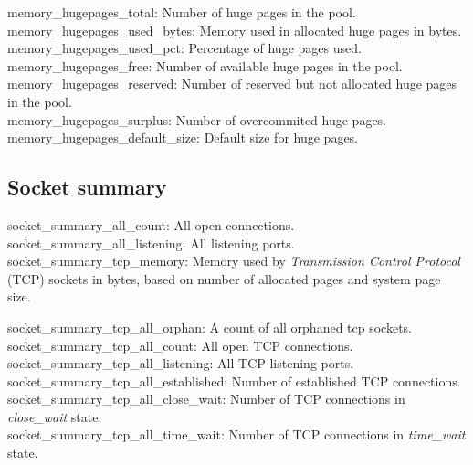 \documentclass{iosart2c}
\begin{document}
memory\_hugepages\_total: Number of huge pages in the pool.\\

memory\_hugepages\_used\_bytes: Memory used in allocated huge pages in bytes.\\

memory\_hugepages\_used\_pct: Percentage of huge pages used.\\

memory\_hugepages\_free: Number of available huge pages in the pool.\\

memory\_hugepages\_reserved: Number of reserved but not allocated huge pages in the pool.\\

memory\_hugepages\_surplus: Number of overcommited huge pages.\\

memory\_hugepages\_default\_size: Default size for huge pages.




\subsection{Socket summary}

socket\_summary\_all\_count: All open connections.\\

socket\_summary\_all\_listening: All listening ports.\\

socket\_summary\_tcp\_memory: Memory used by  \textit{Transmission Control Protocol} (TCP) sockets in bytes, based on number of allocated pages and system page size.

socket\_summary\_tcp\_all\_orphan: A count of all orphaned tcp sockets.\\

socket\_summary\_tcp\_all\_count: All open TCP connections.\\

socket\_summary\_tcp\_all\_listening: All TCP listening ports.\\

socket\_summary\_tcp\_all\_established: Number of established TCP connections.\\

socket\_summary\_tcp\_all\_close\_wait: Number of TCP connections in \textit{close\_wait} state.\\

socket\_summary\_tcp\_all\_time\_wait: Number of TCP connections in \textit{time\_wait} state.\\
\end{document}
